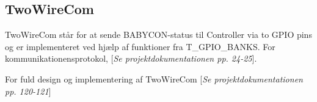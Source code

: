 \subsection{TwoWireCom}
TwoWireCom står for at sende BABYCON-status til Controller via to GPIO pins og er implementeret ved hjælp af funktioner fra T\_GPIO\_BANKS. For kommunikationensprotokol, [\textit{Se projektdokumentationen pp. 24-25}].

For fuld design og implementering af TwoWireCom [\textit{Se projektdokumentationen pp. 120-121}]
